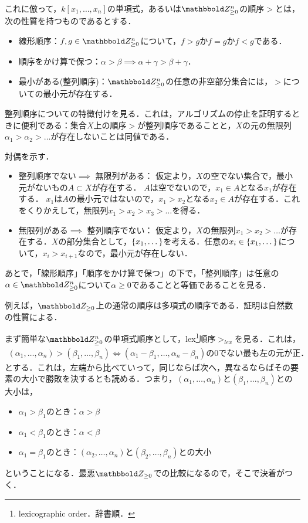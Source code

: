 これに倣って，$k[x_1,\dots,x_n]$の単項式，あるいは$\Zge^n$の順序$>$とは，次の性質を持つものであるとする．
\begin{itemize}
 \item 線形順序：$f,g\in \Zge^n$について，$f > g$か$f=g$か$f < g$である．
 \item 順序をかけ算で保つ：$\alpha > \beta \implies \alpha + \gamma > \beta + \gamma$．
 \item 最小がある(整列順序)：$\Zge^n$の任意の非空部分集合には，$>$についての最小元が存在する．
\end{itemize}

整列順序についての特徴付けを見る．これは，アルゴリズムの停止を証明するときに便利である：集合$X$上の順序$>$が整列順序であることと，$X$の元の無限列$\alpha_1 >  \alpha_2 > \dots$が存在しないことは同値である．
\begin{myproof}
対偶を示す．
 \begin{itemize}
  \item 整列順序でない$\implies$ 無限列がある：
仮定より，$X$の空でない集合で，最小元がないもの$A\subset X$が存在する．
$A$は空でないので，$x_1 \in A$となる$x_1$が存在する．
$x_1$は$A$の最小元ではないので，$x_1 > x_2$となる$x_2 \in A$が存在する．これをくりかえして，無限列$x_1 > x_2 > x_3 > \dots$を得る．
  \item 無限列がある$\implies$ 整列順序でない：
仮定より，$X$の無限列$x_1 > x_2 > \dots$が存在する．$X$の部分集合として，$\left\{x_1,\dots\right\}$を考える．任意の$x_i \in \left\{x_1,\dots\right\}$について，$x_i > x_{i+1}$なので，最小元が存在しない．
 \end{itemize}
\end{myproof}

あとで，「線形順序」「順序をかけ算で保つ」の下で，「整列順序」は任意の$\alpha \in \Zge^n$について$\alpha \ge 0$であることと等価であることを見る．

例えば，$\Zge$上の通常の順序は多項式の順序である．証明は自然数の性質による．

まず簡単な$\Zge^n$の単項式順序として，lex\footnote{lexicographic order．辞書順．}順序$>_{lex}$を見る．これは，
\begin{align}
(\alpha_1,\dots,\alpha_n) > (\beta_1,\dots,\beta_n)
\iff
(\alpha_1 - \beta_1,\dots,\alpha_n - \beta_n)の0でない最も左の元が正．
\end{align}
とする．これは，左端から比べていって，同じならば次へ，異なるならばその要素の大小で勝敗を決するとも読める．つまり，$(\alpha_1,\dots,\alpha_n)$と$(\beta_1,\dots,\beta_n)$との大小は，
\begin{itemize}
 \item $\alpha_1>\beta_1$のとき：$\alpha > \beta$
 \item $\alpha_1 < \beta_1$のとき：$\alpha < \beta$
 \item $\alpha_1 = \beta_1$のとき：$(\alpha_2,\dots,\alpha_n)$と$(\beta_2,\dots,\beta_n)$との大小
\end{itemize}
ということになる．最悪$\Zge$での比較になるので，そこで決着がつく．

